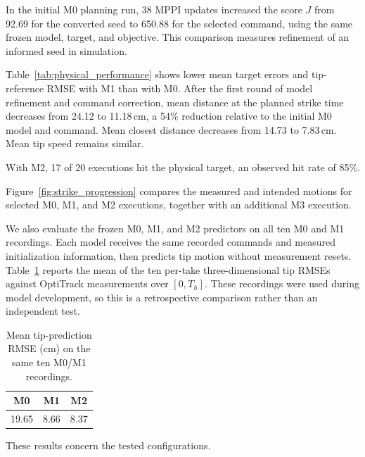 \documentclass[letterpaper, 10 pt, conference]{ieeeconf}
\begin{document}
In the initial M0 planning run, 38 MPPI updates increased the
score $J$ from 92.69 for the converted seed to 650.88 for the
selected command, using the same frozen model, target, and objective.
This comparison measures refinement of an informed seed in simulation.

Table~\ref{tab:physical_performance} shows lower mean target errors
and tip-reference RMSE with M1 than with M0. After the first round
of model refinement and command correction, mean distance at the
planned strike time decreases from 24.12 to 11.18\,cm, a 54\%
reduction relative to the initial M0 model and command. Mean closest
distance decreases from 14.73 to 7.83\,cm. Mean tip speed remains
similar.

With M2, 17 of 20 executions hit the physical target,
an observed hit rate of 85\%.

Figure~\ref{fig:strike_progression} compares the measured and
intended motions for selected M0, M1, and M2 executions,
together with an additional M3 execution.

We also evaluate the frozen M0, M1, and M2 predictors on all ten
M0 and M1 recordings. Each model receives the same recorded
commands and measured initialization information, then predicts
tip motion without measurement resets. Table~\ref{tab:tip_prediction}
reports the mean of the ten per-take three-dimensional tip RMSEs
against OptiTrack measurements over $[0,T_h]$. These recordings
were used during model development, so this is a retrospective
comparison rather than an independent test.

\begin{table}[t]
\centering
\caption{Mean tip-prediction RMSE (cm) on the same ten M0/M1 recordings.}
\label{tab:tip_prediction}
\begin{tabular}{ccc}
\toprule
M0 & M1 & M2 \\
\midrule
19.65 & 8.66 & 8.37 \\
\bottomrule
\end{tabular}
\end{table}

These results concern the tested configurations.



\end{document}
